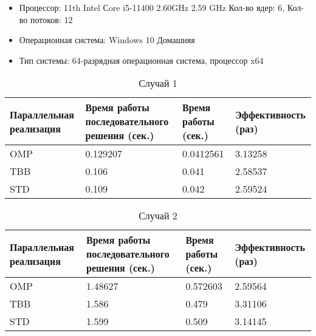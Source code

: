 \documentclass[12pt]{report}
\begin{document}
\begin{itemize}
    \item Процессор: 11th Intel Сore i5-11400 2.60GHz 2.59 GHz Кол-во ядер: 6, Кол-во потоков: 12
    \item Операционная система: Windows 10 Домашняя
    \item Тип системы: 64-разрядная операционная система, процессор x64
\end{itemize}
\par\text{ }
\begin{table}[!h]
    \centering
    \begin{tabular}{| l | l | l | l |}
    \hline
    \scriptsize{Параллельная реализация} & \scriptsize{Время работы последовательного решения (сек.)} & \scriptsize{Время работы (сек.)} & \scriptsize{Эффективность (раз)} \\ \hline
    OMP   &   0.129207    &   0.0412561 &   3.13258  \\ \hline
    TBB   &   0.106    &   0.041   &   2.58537  \\ \hline
    STD   &   0.109   &   0.042   &   2.59524  \\ \hline
    \end{tabular}
    \caption{Случай 1}
\end{table}

\begin{table}[!h]
    \centering
    \begin{tabular}{| l | l | l | l |}
    \hline
    \scriptsize{Параллельная реализация} & \scriptsize{Время работы последовательного решения (сек.)} & \scriptsize{Время работы (сек.)} & \scriptsize{Эффективность (раз)} \\ \hline
    OMP   &   1.48627   &   0.572603   &   2.59564  \\ \hline
    TBB   &   1.586    &   0.479   &   3.31106  \\ \hline
    STD   &   1.599   &   0.509   &   3.14145  \\ \hline
    \end{tabular}
    \caption{Случай 2}
\end{table}
\end{document}
